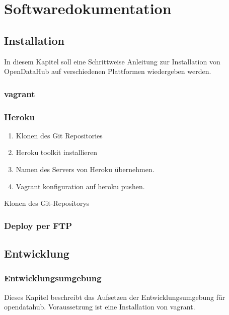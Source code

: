 \part{Softwaredokumentation}

\chapter{Installation}
In diesem Kapitel soll eine Schrittweise Anleitung zur Installation von OpenDataHub auf verschiedenen Plattformen wiedergeben werden.
\section{vagrant}
\section{Heroku}
\begin{enumerate}
\item Klonen des Git Repositories
\item Heroku toolkit installieren
\item Namen des Servers von Heroku übernehmen.
\item Vagrant konfiguration auf heroku pushen.
\end{enumerate}Klonen des Git-Repositorys

\section{Deploy per FTP}

\chapter{Entwicklung}

\section{Entwicklungsumgebung}
Dieses Kapitel beschreibt das Aufsetzen der Entwicklungsumgebung für opendatahub. Voraussetzung ist eine Installation von vagrant.

